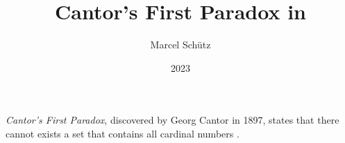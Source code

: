 \documentclass{stex}
\title{Cantor's First Paradox in \Naproche}
\author{Marcel Schütz}
\date{2023}
\begin{document}
\maketitle

\noindent \emph{Cantor's First Paradox}, discovered by Georg Cantor in 1897, states that there cannot exists a set that contains all cardinal numbers \cite[chapter 156]{Cantor1991}.


\printbibliography
\end{document}

